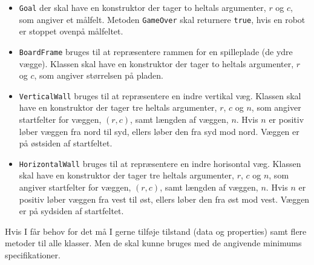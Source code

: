 \begin{itemize}
\item \lstinline{Goal} der skal have en konstruktor der tager to
  heltals argumenter, $r$ og $c$, som angiver et målfelt. Metoden
  \lstinline{GameOver} skal returnere \lstinline{true}, hvis en robot
  er stoppet ovenpå målfeltet.
\item \lstinline{BoardFrame} bruges til at repræsentere rammen for
  en spilleplade (de ydre vægge). Klassen skal have en konstruktor der tager to
  heltals argumenter, $r$ og $c$, som angiver størrelsen på pladen.
\item \lstinline{VerticalWall} bruges til at repræsentere en indre
  vertikal væg. Klassen skal have en konstruktor der tager tre
  heltals argumenter, $r$, $c$ og $n$, som angiver startfelter for
  væggen, $(r,c)$, samt længden af væggen, $n$. Hvis $n$ er positiv
  løber væggen fra nord til syd, ellers løber den fra syd mod
  nord. Væggen er på østsiden af startfeltet.
\item \lstinline{HorizontalWall} bruges til at repræsentere en indre
  horisontal væg. Klassen skal have en konstruktor der tager tre
  heltals argumenter, $r$, $c$ og $n$, som angiver startfelter for
  væggen, $(r,c)$, samt længden af væggen, $n$. Hvis $n$ er positiv
  løber væggen fra vest til øst, ellers løber den fra øst mod
  vest. Væggen er på sydsiden af startfeltet.
\end{itemize}

Hvis I får behov for det må I gerne tilføje tilstand (data og
properties) samt flere metoder til alle klasser. Men de skal kunne
bruges med de angivende minimums specifikationer.




